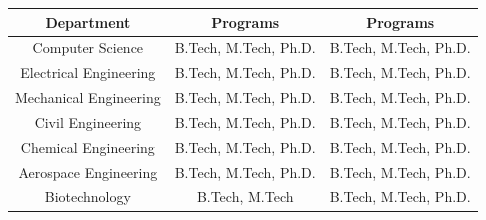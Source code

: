 \documentclass{article}
\begin{document}
\begin{tabular}{|c|c|c|}
    \hline
    Department & Programs & Programs \\
    \hline
    Computer Science & B.Tech, M.Tech, Ph.D. & B.Tech, M.Tech, Ph.D. \\
    Electrical Engineering & B.Tech, M.Tech, Ph.D. & B.Tech, M.Tech, Ph.D.  \\
    Mechanical Engineering & B.Tech, M.Tech, Ph.D. & B.Tech, M.Tech, Ph.D.  \\
    Civil Engineering & B.Tech, M.Tech, Ph.D. & B.Tech, M.Tech, Ph.D.  \\
    Chemical Engineering & B.Tech, M.Tech, Ph.D. & B.Tech, M.Tech, Ph.D.  \\
    Aerospace Engineering & B.Tech, M.Tech, Ph.D. & B.Tech, M.Tech, Ph.D.  \\
    Biotechnology & B.Tech, M.Tech & B.Tech, M.Tech, Ph.D. \\
    \hline
\end{tabular}
\end{document}
